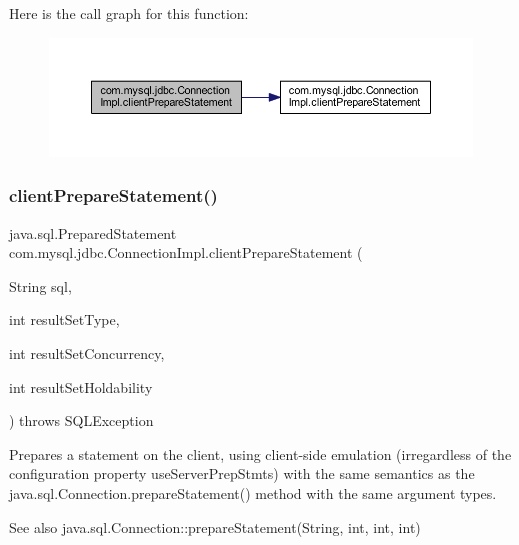 Here is the call graph for this function\+:\nopagebreak
\begin{figure}[H]
\begin{center}
\leavevmode
\includegraphics[width=350pt]{classcom_1_1mysql_1_1jdbc_1_1_connection_impl_a9fcf3d739e8b60bdc9666e938ecd75ab_cgraph}
\end{center}
\end{figure}
\mbox{\label{classcom_1_1mysql_1_1jdbc_1_1_connection_impl_ab4f506b0ae8623a91e4aea7f33bb2da5}} 
\subsubsection{\texorpdfstring{client\+Prepare\+Statement()}{clientPrepareStatement()}\hspace{0.1cm}{\footnotesize\ttfamily [6/6]}}
{\footnotesize\ttfamily java.\+sql.\+Prepared\+Statement com.\+mysql.\+jdbc.\+Connection\+Impl.\+client\+Prepare\+Statement (\begin{DoxyParamCaption}\item[{String}]{sql,  }\item[{int}]{result\+Set\+Type,  }\item[{int}]{result\+Set\+Concurrency,  }\item[{int}]{result\+Set\+Holdability }\end{DoxyParamCaption}) throws S\+Q\+L\+Exception}

Prepares a statement on the client, using client-\/side emulation (irregardless of the configuration property \textquotesingle{}use\+Server\+Prep\+Stmts\textquotesingle{}) with the same semantics as the java.\+sql.\+Connection.\+prepare\+Statement() method with the same argument types.

\begin{DoxySeeAlso}{See also}
java.\+sql.\+Connection\+::prepare\+Statement(\+String, int, int, int) 
\end{DoxySeeAlso}


